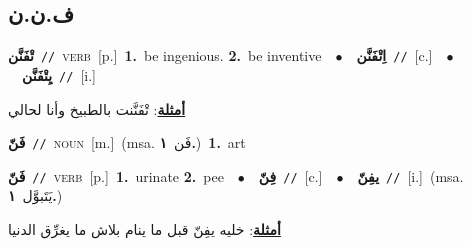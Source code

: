\documentclass[10pt,a4paper,twoside]{article} %
\begin{document}
\begin{multicols}{2}
\vspace{-3mm}
\subsection*{\color{blue}\foreignlanguage{arabic}{ف.ن.ن}\color{blue}{}} 

{\setlength\topsep{0pt}\textbf{\foreignlanguage{arabic}{تْفَنَّن}}\ {\color{gray}\texttt{//}\color{black}}\ \textsc{verb}\ [p.]\ \textbf{1.}~be ingenious.  \textbf{2.}~be inventive\ \ $\bullet$\ \ \setlength\topsep{0pt}\textbf{\foreignlanguage{arabic}{اِتْفَنَّن}}\ {\color{gray}\texttt{//}\color{black}}\ [c.]\ \ $\bullet$\ \ \setlength\topsep{0pt}\textbf{\foreignlanguage{arabic}{يِتْفَنَّن}}\ {\color{gray}\texttt{//}\color{black}}\ [i.]\  \begin{flushright}\color{gray}\foreignlanguage{arabic}{\textbf{\underline{\foreignlanguage{arabic}{أمثلة}}}: تْفَنَّنت بالطبيخ وأنا لحالي}\end{flushright}\color{black}} \vspace{2mm}

{\setlength\topsep{0pt}\textbf{\foreignlanguage{arabic}{فَنّ}}\ {\color{gray}\texttt{//}\color{black}}\ \textsc{noun}\ [m.]\ \color{gray}(msa. \foreignlanguage{arabic}{فَن}~\foreignlanguage{arabic}{\textbf{١.}})\color{black}\ \textbf{1.}~art\ } \vspace{2mm}

{\setlength\topsep{0pt}\textbf{\foreignlanguage{arabic}{فَنّ}}\ {\color{gray}\texttt{//}\color{black}}\ \textsc{verb}\ [p.]\ \textbf{1.}~urinate  \textbf{2.}~pee\ \ $\bullet$\ \ \setlength\topsep{0pt}\textbf{\foreignlanguage{arabic}{فِنّ}}\ {\color{gray}\texttt{//}\color{black}}\ [c.]\ \ $\bullet$\ \ \setlength\topsep{0pt}\textbf{\foreignlanguage{arabic}{يفِنّ}}\ {\color{gray}\texttt{//}\color{black}}\ [i.]\ \color{gray}(msa. \foreignlanguage{arabic}{يَتَبوَّل}~\foreignlanguage{arabic}{\textbf{١.}})\color{black}\  \begin{flushright}\color{gray}\foreignlanguage{arabic}{\textbf{\underline{\foreignlanguage{arabic}{أمثلة}}}: خليه يفِنّ قبل ما ينام بلاش ما يغرِّق الدنيا}\end{flushright}\color{black}} \vspace{2mm}


\end{multicols}
\end{document}
